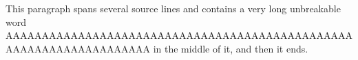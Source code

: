 \documentclass{article}
\begin{document}
This paragraph spans several source lines and
contains a very long unbreakable word
AAAAAAAAAAAAAAAAAAAAAAAAAAAAAAAAAAAAAAAAAAAAAAAAAAAAAAAAAAAAAAAAAAAA
in the middle of it, and then it ends.
\end{document}
